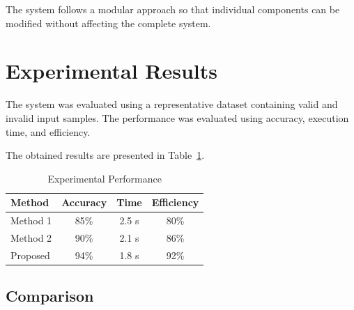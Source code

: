 \documentclass[conference]{IEEEtran}
\begin{document}
The system follows a modular approach so that individual
components can be modified without affecting the complete
system.


\section{Experimental Results}

The system was evaluated using a representative dataset
containing valid and invalid input samples. The performance
was evaluated using accuracy, execution time, and efficiency.

The obtained results are presented in
Table~\ref{tab:results}.


\begin{table}[H]

\centering

\caption{Experimental Performance}

\label{tab:results}

\begin{tabular}{lccc}

\toprule

Method & Accuracy & Time & Efficiency \\

\midrule

Method 1 & 85\% & 2.5 s & 80\% \\

Method 2 & 90\% & 2.1 s & 86\% \\

Proposed & 94\% & 1.8 s & 92\% \\

\bottomrule

\end{tabular}

\end{table}


\subsection{Comparison}
\end{document}
